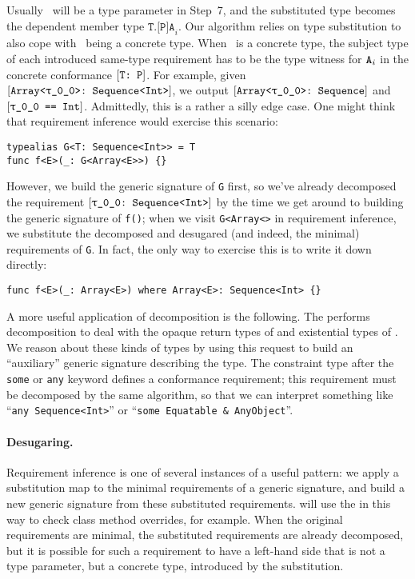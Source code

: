\documentclass[../generics]{subfiles}
\begin{document}
Usually \tT\ will be a type parameter in Step~7, and the substituted type becomes the dependent member type $\texttt{T.[P]A}_i$. Our algorithm relies on type substitution to also cope with \tT\ being a concrete type. When \tT\ is a concrete type, the subject type of each introduced same-type requirement has to be the type witness for $\texttt{A}_i$ in the concrete conformance $[\texttt{T:~P}]$. For example, given $\ConfReq{Array<\rT>}{Sequence<Int>}$, we output $\ConfReq{Array<\rT>}{Sequence}$ and $\SameReq{\rT}{Int}$. Admittedly, this is a rather a silly edge case. One might think that requirement inference would exercise this scenario:
\begin{Verbatim}
typealias G<T: Sequence<Int>> = T
func f<E>(_: G<Array<E>>) {}
\end{Verbatim}
However, we build the generic signature of \texttt{G} first, so we've already decomposed the requirement $\ConfReq{\rT}{Sequence<Int>}$ by the time we get around to building the generic signature of \texttt{f()}; when we visit \texttt{G<Array<\rT>} in requirement inference, we substitute the decomposed and desugared (and indeed, the minimal) requirements of \texttt{G}. In fact, the only way to exercise this is to write it down directly:
\begin{Verbatim}
func f<E>(_: Array<E>) where Array<E>: Sequence<Int> {}
\end{Verbatim}

A more useful application of decomposition is the following. The  performs decomposition to deal with the opaque return types of  and existential types of . We reason about these kinds of types by using this request to build an ``auxiliary'' generic signature describing the type. The constraint type after the \texttt{some} or \texttt{any} keyword defines a conformance requirement; this requirement must be decomposed by the same algorithm, so that we can interpret something like ``\texttt{any Sequence<Int>}'' or ``\verb|some Equatable & AnyObject|''.

\paragraph{Desugaring.}
Requirement inference is one of several instances of a useful pattern: we apply a substitution map to the minimal requirements of a generic signature, and build a new generic signature from these substituted requirements.  will use the  in this way to check class method overrides, for example. When the original requirements are minimal, the substituted requirements are already decomposed, but it is possible for such a requirement to have a left-hand side that is not a type parameter, but a concrete type, introduced by the substitution.
\end{document}
